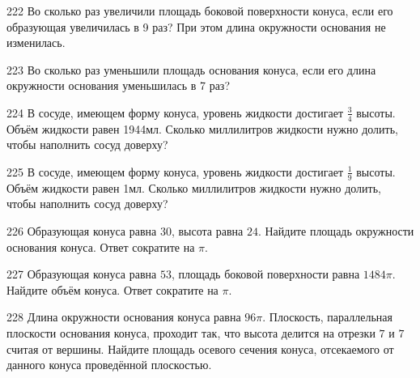 \documentclass[a4paper]{article}
\begin{document}
\begin{taskBN}{222}
Во сколько раз увеличили площадь боковой поверхности конуса, если его образующая увеличилась в 9 раз? При этом длина окружности основания не изменилась.
\end{taskBN}

\begin{taskBN}{223}
Во сколько раз уменьшили площадь основания конуса, если его длина окружности основания уменьшилась в 7 раз?
\end{taskBN}

\begin{taskBN}{224}
В сосуде, имеющем форму конуса, уровень жидкости достигает $\frac{3}{4}$ высоты. Объём жидкости равен 1944мл. Сколько миллилитров жидкости нужно долить, чтобы наполнить сосуд доверху?
\end{taskBN}

\begin{taskBN}{225}
В сосуде, имеющем форму конуса, уровень жидкости достигает $\frac{1}{9}$ высоты. Объём жидкости равен 1мл. Сколько миллилитров жидкости нужно долить, чтобы наполнить сосуд доверху?
\end{taskBN}

\begin{taskBN}{226}
Образующая конуса равна $30$, высота равна $24$. Найдите площадь окружности основания конуса. Ответ сократите на $\pi$.
\end{taskBN}

\begin{taskBN}{227}
Образующая конуса равна $53$, площадь боковой поверхности равна $1484\pi$. Найдите объём конуса. Ответ сократите на $\pi$.
\end{taskBN}

\begin{taskBN}{228}
Длина окружности основания конуса равна $96\pi$. Плоскость, параллельная плоскости основания конуса,  проходит так, что высота делится на отрезки $7$ и $7$ считая от вершины. Найдите площадь осевого сечения конуса, отсекаемого от данного конуса проведённой плоскостью. 
\end{taskBN}
\end{document}
